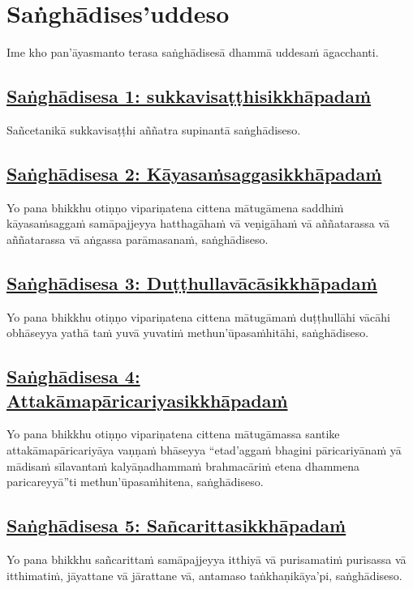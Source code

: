 \setsecheadstyle{\sectionFmt}
\section{Saṅghādises'uddeso}
\label{sd}

\begin{intro}
  Ime kho pan'āyasmanto terasa saṅghādisesā dhammā uddesaṁ āgacchanti.
\end{intro}

\subsection*{\hyperref[comm1]{Saṅghādisesa 1: sukkavisaṭṭhisikkhāpadaṁ}}
\label{sd1}
Sañcetanikā sukkavisaṭṭhi aññatra supinantā saṅghādiseso.

\subsection*{\hyperref[comm2]{Saṅghādisesa 2: Kāyasaṁsaggasikkhāpadaṁ}}
\label{sd2}
Yo pana bhikkhu otiṇṇo vipariṇatena cittena mātugāmena saddhiṁ kāyasaṁsaggaṁ samāpajjeyya hatthagāhaṁ vā veṇigāhaṁ vā aññatarassa vā aññatarassa vā aṅgassa parāmasanaṁ, saṅghādiseso.

\subsection*{\hyperref[comm3]{Saṅghādisesa 3: Duṭṭhullavācāsikkhāpadaṁ}}
\label{sd3}
Yo pana bhikkhu otiṇṇo vipariṇatena cittena mātugāmaṁ duṭṭhullāhi vācāhi obhāseyya yathā taṁ yuvā yuvatiṁ methun'ūpasaṁhitāhi, saṅghādiseso.

\subsection*{\hyperref[comm4]{Saṅghādisesa 4: Attakāmapāricariyasikkhāpadaṁ}}
\label{sd4}
Yo pana bhikkhu otiṇṇo vipariṇatena cittena mātugāmassa santike attakāmapāricariyāya vaṇṇaṁ bhāseyya “etad'aggaṁ bhagini pāricariyānaṁ yā mādisaṁ sīlavantaṁ kalyāṇadhammaṁ brahmacāriṁ etena dhammena paricareyyā”ti methun'ūpasaṁhitena, saṅghādiseso.

\subsection*{\hyperref[comm5]{Saṅghādisesa 5: Sañcarittasikkhāpadaṁ}}
\label{sd5}
Yo pana bhikkhu sañcarittaṁ samāpajjeyya itthiyā vā purisamatiṁ purisassa vā itthimatiṁ, jāyattane vā jārattane vā, antamaso taṅkhaṇikāya'pi, saṅghādiseso.

